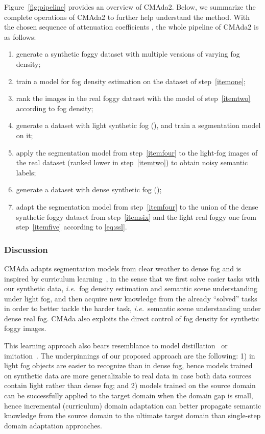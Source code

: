 \documentclass[twocolumn]{svjour3}          \smartqed  \usepackage{graphicx}
\newcommand{\ie}{\mbox{\emph{i.e.\ }}}
\begin{document}
Figure~\ref{fig:pipeline} provides an overview of CMAda2. Below, we summarize the complete operations of CMAda2 to further help understand the method.
With the chosen sequence of attenuation coefficients , the whole pipeline of CMAda2 is as follows: 
\begin{enumerate}
    \item generate a synthetic foggy dataset with multiple versions of varying fog density; \label{itemone}
    \item train a model for fog density estimation on the dataset of step~\ref{itemone}; \label{itemtwo}
    \item rank the images in the real foggy dataset with the model of step~\ref{itemtwo} according to fog density; \label{itemthree}
    \item generate a dataset with light synthetic fog (), and train a segmentation model on it; \label{itemfour}
    \item apply the segmentation model from step~\ref{itemfour} to the light-fog images of the real dataset (ranked lower in step~\ref{itemtwo}) to obtain noisy semantic labels; \label{itemfive}
    \item generate a dataset with dense synthetic fog (); \label{itemsix}
    \item adapt the segmentation model from step~\ref{itemfour} to the union of the dense synthetic foggy dataset from step~\ref{itemsix} and the light real foggy one from step~\ref{itemfive} according to \eqref{eq:ssl}. \label{itemseven}
\end{enumerate}

\subsubsection{Discussion}

CMAda adapts segmentation models from clear weather to dense fog and is inspired by curriculum learning~\cite{curriculum:learning}, in the sense that we first solve easier tasks with our synthetic data, \ie{}fog density estimation and semantic scene understanding under light fog, and then acquire new knowledge from the already ``solved'' tasks in order to better tackle the harder task, \ie{}semantic scene understanding under dense real fog. CMAda also exploits the direct control of fog density for synthetic foggy images.  

This learning approach also bears resemblance to model distillation~\cite{hinton2015distilling,supervision:transfer} or imitation~\cite{model:compression,dai:metric:imitation}. The underpinnings of our proposed approach are the following: 1) in light fog objects are easier to recognize than in dense fog, hence models trained on synthetic data are more generalizable to real data in case both data sources contain light rather than dense fog; and 2) models trained on the source domain can be successfully applied to the target domain when the domain gap is small, hence incremental (curriculum) domain adaptation can better propagate semantic knowledge from the source domain to the ultimate target domain than single-step domain adaptation approaches. 
\end{document}
